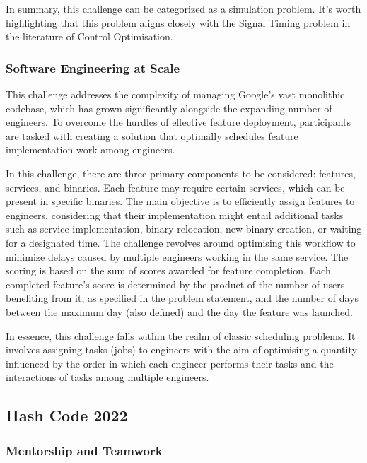 In summary, this challenge can be categorized as a simulation problem. It's
worth highlighting that this problem aligns closely with the Signal Timing
problem in the literature of Control Optimisation.

\subsubsection*{Software Engineering at Scale}
\label{subsubsec:hashcode-2021-final}

This challenge addresses the complexity of managing Google's vast monolithic
codebase, which has grown significantly alongside the expanding number of
engineers. To overcome the hurdles of effective feature deployment, participants
are tasked with creating a solution that optimally schedules feature
implementation work among engineers.

In this challenge, there are three primary components to be considered: features,
services, and binaries. Each feature may require certain services, which can be
present in specific binaries. The main objective is to efficiently assign
features to engineers, considering that their implementation might entail
additional tasks such as service implementation, binary relocation, new binary
creation, or waiting for a designated time. The challenge revolves around
optimising this workflow to minimize delays caused by multiple engineers working
in the same service. The scoring is based on the sum of scores awarded for
feature completion. Each completed feature's score is determined by the product
of the number of users benefiting from it, as specified in the problem
statement, and the number of days between the maximum day (also defined) and the
day the feature was launched.

In essence, this challenge falls within the realm of classic scheduling
problems. It involves assigning tasks (jobs) to engineers with the aim of
optimising a quantity influenced by the order in which each engineer performs
their tasks and the interactions of tasks among multiple engineers.

\subsection{Hash Code 2022}
\label{subsec:hashcode-2022}

\subsubsection*{Mentorship and Teamwork}
\label{subsubsec:hashcode-2022-qualification}

